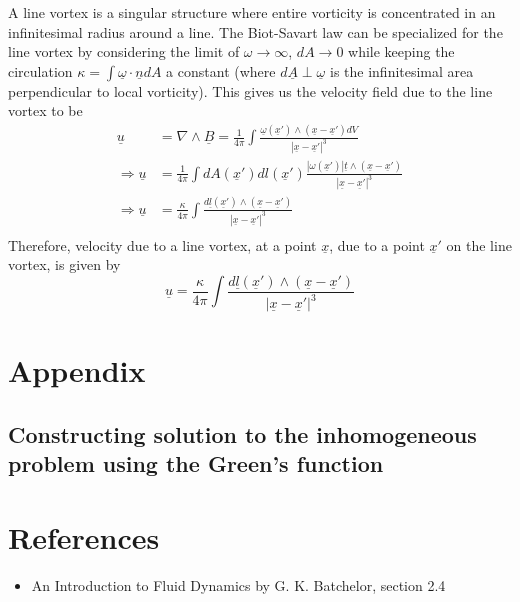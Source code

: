 \documentclass[11pt,a4paper]{article}
\newcommand{\vect}[1]{\underline{#1}}
\newcommand{\1}{\vect{1}}
\newcommand{\curl}[1]{\nabla\wedge\vect{#1}}
\newcommand{\RA}{\Rightarrow}
\begin{document}
A line vortex is a singular structure where entire vorticity is concentrated in an infinitesimal radius around a line. The Biot-Savart law can be specialized for the line vortex by considering the limit of $\omega \to \infty$, $dA \to 0$ while keeping the circulation $\kappa = \int \vect \omega\cdot\vect n dA$ a constant (where $d\vect A \perp \vect\omega$ is the infinitesimal area perpendicular to local vorticity). This gives us the velocity field due to the line vortex to be
\begin{align*}
\vect u &= \curl B = \frac{1}{4\pi}\int \frac{\vect\omega(\vect x')\wedge(\vect x-\vect x') dV}{|\vect x-\vect x'|^3}\\
\RA\vect u &= \frac{1}{4\pi}\int dA(\vect x') dl(\vect x') \frac{|\omega(\vect x')|\vect t \wedge(\vect x-\vect x')}{|\vect x-\vect x'|^3}\\
\RA\vect u &= \frac{\kappa}{4\pi}\int \frac{d\vect l(\vect x')\wedge(\vect x-\vect x')}{|\vect x-\vect x'|^3}\\
\end{align*}
Therefore, velocity due to a line vortex, at a point $\vect x$, due to a point $\vect x'$ on the line vortex, is given by
\begin{equation*}
\boxed{\vect u = \frac{\kappa}{4\pi}\int \frac{d\vect l(\vect x')\wedge(\vect x-\vect x')}{|\vect x-\vect x'|^3}}
\end{equation*}

\section{Appendix}

\subsection{Constructing solution to the inhomogeneous problem using the Green's function}

\section{References}
\begin{itemize}
\item An Introduction to Fluid Dynamics by G. K. Batchelor, section 2.4
\end{itemize}
\end{document}
